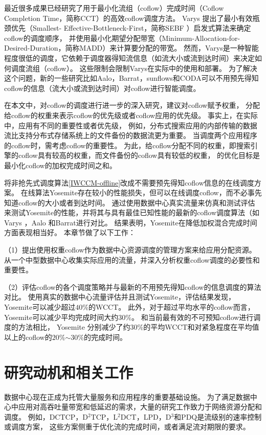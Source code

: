  最近很多成果已经研究了用于最小化流组（coflow）完成时间（Coflow Completion Time，简称CCT）的高效coflow调度方法。
 Varys \cite{chowdhury2014efficient}提出了最小有效瓶颈优先（Smallest- Effective-Bottleneck-First，简称SEBF ）启发式算法来确定coflow的调度顺序，
 并使用最小化期望分配带宽（Minimum-Allocation-for-Desired-Duration，简称MADD）来计算要分配的带宽。
然而，Varys是一种智能程度很低的调度，它依赖于调度器得知流信息（如流大小或流到达时间）来决定如何调度流组（coflow）。
这些限制会限制Varys在实际中的使用和部署。
为了解决这个问题，新的一些研究比如Aalo\cite{chowdhury2015efficient}，Barrat\cite{dogar2014decentralized}，sunflows\cite{huang2016sunflow}和CODA\cite{zhang2016coda}可以不用预先得知coflow的信息（流大小或流到达时间）对coflow进行智能调度。
 
在本文中，对coflow的调度进行进一步的深入研究，建议对coflow赋予权重，
分配给coflow的权重来表示coflow的优先级或者coflow应用的优先级。
事实上，在实际中，应用有不同的重要性或者优先级，
例如，分布式搜索应用的内部传输的数据流比支持分布式存储系统上的文件备份的数据流更为重要。
当调度两个应用程序的coflow时，需考虑coflow的重要性。
为此，给coflow分配不同的权重，即搜索引擎的coflow具有较高的权重，而文件备份的coflow具有较低的权重，
的优化目标是最小化coflow的加权完成时间之和。

将非抢先式调度算法\ref{IWCCM-offline}改成不需要预先得知coflow信息的在线调度方案。
在线算法Yosemite存在较小的性能损失，但可以在线调度coflow，而不必事先知道coflow的大小或者到达时间。
通过使用数据中心真实流量来仿真和测试评估来测试Yosemite的性能，并将其与具有最佳已知性能的最新的coflow调度算法（如Varys \cite{chowdhury2014efficient}，Aalo \cite{chowdhury2015efficient}和Barrat\cite{dogar2014decentralized}进行对比。
结果表明，Yosemite在降低加权混合完成时间方面表现相当好。
本章节做了以下工作：

（1）提出使用权重coflow作为数据中心资源调度的管理方案来给应用分配资源。
从一个中型数据中心收集实际应用的流量，并深入分析权重coflow调度的必要性和重要性。


（2）评估coflow的各个调度策略并与最新的不用预先得知coflow的信息调度的算法对比。
使用真实的数据中心流量评估并且测试Yosemite，评估结果发现，Yosemite可以减少超过$40\%$的WCCT。
此外，对于超过平均水平的coflow而言，Yosemite可以减少平均完成时间大约$30\%$。
和当前最有效的不可预知coflow进行调度的方法相比，
Yosemite 分别减少了约$30\%$的平均WCCT和对紧急程度在平均值以上的coflow的$20\%$$\sim$$30\%$的完成时间。

\section{研究动机和相关工作}\label{Yosemite-motivation}
数据中心现在正成为托管大量服务和应用程序的重要基础设施。
为了满足数据中心中应用对高吞吐量带宽和低延迟的需求，大量的研究工作致力于网络资源分配和调度。
例如，DCTCP\cite{DCTCP}，D$^2$TCP\cite{D2TCP}，L$^2$DCT\cite{L2DCT}，LPD\cite{LPD}，D$^3$\cite{D3}和PDQ是流级别的速率控制或调度方案，
这些方案侧重于优化流的完成时间，或者满足流对期限的要求。

